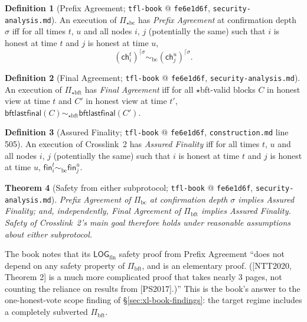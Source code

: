 \documentclass[11pt,a4paper]{article}
\newtheorem{theorem}{Theorem}[section]
\theoremstyle{definition}
\newtheorem{definition}[theorem]{Definition}
\begin{document}
\begin{definition}[Prefix Agreement; \texttt{tfl-book} @
\texttt{fe6e1d6f}, \texttt{security-analysis.md}]
\label{def:xl-prefix-agreement-ntt}
An execution of $\Pi_{\star\mathrm{bc}}$ has \emph{Prefix Agreement} at
confirmation depth $\sigma$ iff for all times $t$, $u$ and all nodes $i$,
$j$ (potentially the same) such that $i$ is honest at time $t$ and $j$ is
honest at time $u$,
\[
(\mathsf{ch}_i^t)^{\lceil\sigma} \sim_{\mathrm{bc}}
(\mathsf{ch}_j^u)^{\lceil\sigma}.
\]
\end{definition}

\begin{definition}[Final Agreement; \texttt{tfl-book} @
\texttt{fe6e1d6f}, \texttt{security-analysis.md}]
\label{def:xl-final-agreement-ntt}
An execution of $\Pi_{\star\mathrm{bft}}$ has \emph{Final Agreement}
iff for all $\star$bft-valid blocks $C$ in honest view at time $t$ and
$C'$ in honest view at time $t'$,
$\mathsf{bftlastfinal}(C) \sim_{\star\mathrm{bft}}
\mathsf{bftlastfinal}(C')$.
\end{definition}

\begin{definition}[Assured Finality; \texttt{tfl-book} @
\texttt{fe6e1d6f}, \texttt{construction.md} line 505]
\label{def:xl-assured-finality-ntt}
An execution of Crosslink~2 has \emph{Assured Finality} iff for all times
$t$, $u$ and all nodes $i$, $j$ (potentially the same) such that $i$ is
honest at time $t$ and $j$ is honest at time $u$,
$\mathsf{fin}_i^t \sim_{\mathrm{bc}} \mathsf{fin}_j^u$.
\end{definition}

\begin{theorem}[Safety from either subprotocol; \texttt{tfl-book} @
\texttt{fe6e1d6f}, \texttt{security-analysis.md}]
\label{thm:xl-assured-either}
Prefix Agreement of $\Pi_{\mathrm{bc}}$ at confirmation depth $\sigma$
implies Assured Finality; and, independently, Final Agreement of
$\Pi_{\mathrm{bft}}$ implies Assured Finality. Safety of Crosslink~2's
main goal therefore holds under reasonable assumptions about
\emph{either} subprotocol.
\end{theorem}

The book notes that its $\mathsf{LOG}_{\mathrm{fin}}$ safety proof from
Prefix Agreement ``does not depend on any safety property of
$\Pi_{\mathrm{bft}}$, and is an elementary proof. ([NTT2020, Theorem 2]
is a much more complicated proof that takes nearly 3 pages, not counting
the reliance on results from [PS2017].)'' This is the book's answer to
the one-honest-vote scope finding of \S\ref{sec:xl-book-findings}: the
target regime includes a completely subverted $\Pi_{\mathrm{bft}}$.
\end{document}
